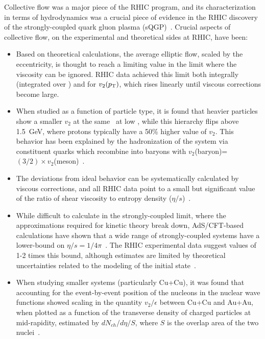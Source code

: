 Collective flow was a major piece of the RHIC program, and its characterization
in terms of hydrodynamics was a crucial piece of evidence in the RHIC discovery
of the strongly-coupled quark gluon plasma (sQGP)~\cite{Back:2004je,Adcox:2004mh,Adams:2005dq,Arsene:2004fa}.  
Crucial aspects of collective
flow, on the experimental and theoretical sides at RHIC, have been:
\begin{itemize}
\item Based on theoretical calculations, the average elliptic flow, scaled by the eccentricity,
is thought to reach a limiting value in the limit where
the viscosity can be ignored.  RHIC data achieved this limit both integrally (integrated over \pT)
and for $v_2(\mbox{$p_{\mathrm{T}}$})$, which rises linearly until viscous corrections become large.
\item When studied as a function of particle type, it is found that heavier particles show
a smaller $v_2$ at the same \pT\ at low \pT, while this hierarchy flips above 1.5~GeV, where protons
typically have a 50\% higher value of $v_2$.  This behavior has been explained by the hadronization of
the system via constituent quarks which recombine into baryons with $v_2$(baryon)=$(3/2) \times v_2$(meson)~\cite{Adare:2006ti,Fries:2003vb}.
\item The deviations from ideal behavior can be systematically calculated by viscous corrections, and
all RHIC data point to a small but significant value of the ratio of shear viscosity to entropy density ($\eta/s$)~\cite{Luzum:2008cw}.
\item While difficult to calculate in the strongly-coupled limit, where the approximations required for kinetic theory break down, AdS/CFT-based calculations have shown that a wide range of strongly-coupled systems have a lower-bound on
$\eta/s = 1/4\pi$~\cite{Kovtun:2004de}.  The RHIC experimental data suggest values of 1-2 times this bound, although estimates are limited
by theoretical uncertainties related to the modeling of the initial state~\cite{Luzum:2008cw}.
\item When studying smaller systems (particularly Cu+Cu), it was found that accounting for the event-by-event position of the nucleons in the nuclear wave functions showed scaling in the quantity $v_2/\epsilon$ between Cu+Cu and Au+Au, when
plotted as a function of the transverse density of charged particles at mid-rapidity, estimated by $dN_{ch}/d\eta/S$,
where $S$ is the overlap area of the two nuclei~\cite{Alver:2008zza}.
\end{itemize}

